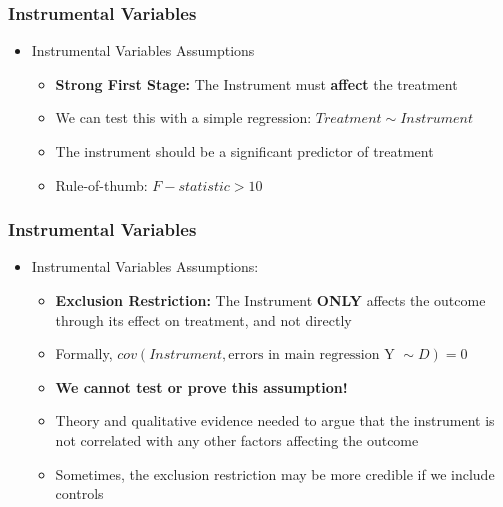 \documentclass[xcolor=x11names,compress]{beamer}\usepackage[]{graphicx}\usepackage[]{color}
\renewcommand{\(}{\begin{columns}}
\renewcommand{\)}{\end{columns}}
\newcommand{\<}[1]{\begin{column}{#1}}
\renewcommand{\>}{\end{column}}
\begin{document}
\begin{frame}
\frametitle{Instrumental Variables}
\begin{itemize}
\item Instrumental Variables Assumptions
\begin{itemize}
\item \textbf{Strong First Stage:} The Instrument must \textbf{affect} the treatment
\pause
\item We can test this with a simple regression: $Treatment \sim Instrument$
\pause
\item The instrument should be a significant predictor of treatment
\item Rule-of-thumb: $F-statistic > 10$
\end{itemize}
\end{itemize}
\end{frame}

\begin{frame}
\frametitle{Instrumental Variables}
\begin{itemize}
\item Instrumental Variables Assumptions:
\begin{itemize}
\item \textbf{Exclusion Restriction:} The Instrument \textbf{ONLY} affects the outcome through its effect on treatment, and not directly
\pause
\item Formally, $cov(Instrument,\text{errors in main regression Y }\sim D)=0$
\pause
\item \textbf{We cannot test or prove this assumption!}
\pause
\item Theory and qualitative evidence needed to argue that the instrument is not correlated with any other factors affecting the outcome
\item Sometimes, the exclusion restriction may be more credible if we include controls
\end{itemize}
\end{itemize}
\end{frame}
\end{document}
